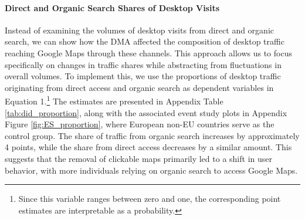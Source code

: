 \documentclass[11pt]{article}
\begin{document}
	
	
	
	
	
	\clearpage
	
	\paragraph{Direct and Organic Search Shares of Desktop Visits} Instead of examining the volumes of desktop visits from direct and organic search, we can show how the DMA affected the composition of desktop traffic reaching Google Maps through these channels. This approach allows us to focus specifically on changes in traffic shares while abstracting from fluctuations in overall volumes. To implement this, we use the proportions of desktop traffic originating from direct access and organic search as dependent variables in Equation 1.\footnote{Since this variable ranges between zero and one, the corresponding point estimates are interpretable as a probability.} The estimates are presented in Appendix Table \ref{tab:did_proportion}, along with the associated event study plots in Appendix Figure \ref{fig:ES_proportion}, where European non-EU countries serve as the control group. The share of traffic from organic search increases by approximately 4 points, while the share from direct access decreases by a similar amount. This suggests that the removal of clickable maps primarily led to a shift in user behavior, with more individuals relying on organic search to access Google Maps.
	
	
	
\end{document}
